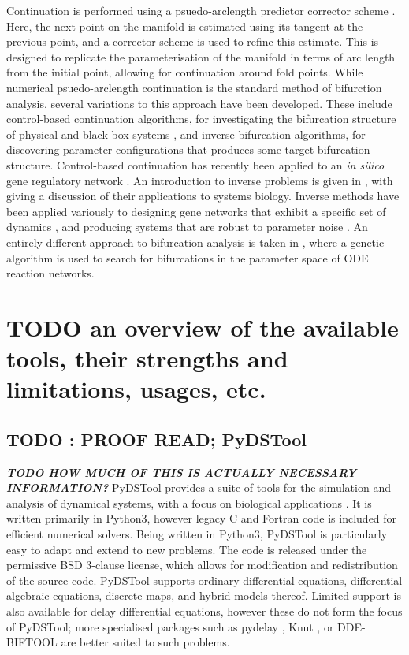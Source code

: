 \documentclass[a4paper,twoside]{article}
\begin{document}
Continuation is performed using a psuedo-arclength predictor corrector scheme \cite{keller1977numerical}.
Here, the next point on the manifold is estimated using its tangent at the previous point, and a corrector scheme is used to refine this estimate.
This is designed to replicate the parameterisation of the manifold in terms of arc length from the initial point, allowing for continuation around fold points.
While numerical psuedo-arclength continuation is the standard method of bifurction analysis, several variations to this approach have been developed.
These include control-based continuation algorithms, for investigating the bifurcation structure of physical and black-box systems \cite{pyragas1992continuous,pyragas2001control,barton2013systematic,sieber2008control}, and inverse bifurcation algorithms, for discovering parameter configurations that produces some target bifurcation structure.
Control-based continuation has recently been applied to an \emph{in silico} gene regulatory network \cite{gomes2019exploring}.
An introduction to inverse problems is given in \cite{engl2005nonlinear,engl2009inverse}, with \cite{engl2009inverse} giving a discussion of their applications to systems biology.
Inverse methods have been applied variously to designing gene networks that exhibit a specific set of dynamics \cite{lu2006inverse}, and producing systems that are robust to parameter noise \cite{kitajima2015method}.
An entirely different approach to bifurcation analysis is taken in \cite{chickarmane2005bifurcation}, where a genetic algorithm is used to search for bifurcations in the parameter space of ODE reaction networks.


\section{{\bfseries\sffamily TODO} an overview of the available tools, their strengths and limitations, usages, etc.}
\label{sec:orgcc4f7f2}
\subsection{{\bfseries\sffamily TODO} : PROOF READ; PyDSTool}
\label{sec:org4bff84c}
\uline{\textbf{\emph{TODO HOW MUCH OF THIS IS ACTUALLY NECESSARY INFORMATION?}}}
PyDSTool provides a suite of tools for the simulation and analysis of dynamical systems, with a focus on biological applications \cite{clewley2012hybrid}.
It is written primarily in Python3, however legacy C and Fortran code is included for efficient numerical solvers.
Being written in Python3, PyDSTool is particularly easy to adapt and extend to new problems.
The code is released under the permissive BSD 3-clause license, which allows for modification and redistribution of the source code.
PyDSTool supports ordinary differential equations, differential algebraic equations, discrete maps, and hybrid models thereof.
Limited support is also available for delay differential equations, however these do not form the focus of PyDSTool; more specialised packages such as pydelay \cite{FLU09a}, Knut \cite{szalaiknut}, or DDE-BIFTOOL \cite{engelborghs2002numerical} are better suited to such problems.
\end{document}
